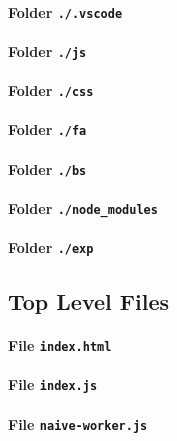 \paragraph{Folder \texttt{./.vscode}}

\paragraph{Folder \texttt{./js}}

\paragraph{Folder \texttt{./css}}

\paragraph{Folder \texttt{./fa}}

\paragraph{Folder \texttt{./bs}}

\paragraph{Folder \texttt{./node\_modules}}

\paragraph{Folder \texttt{./exp}}

\subsection{Top Level Files}

\paragraph{File \texttt{index.html}}

\paragraph{File \texttt{index.js}}

\paragraph{File \texttt{naive-worker.js}}

